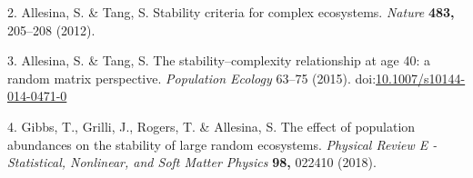 \documentclass[]{article}
\begin{document}
\hypertarget{ref-Allesina2012}{}
2. Allesina, S. \& Tang, S. Stability criteria for complex ecosystems.
\emph{Nature} \textbf{483,} 205--208 (2012).

\hypertarget{ref-Allesina2015a}{}
3. Allesina, S. \& Tang, S. The stability--complexity relationship at
age 40: a random matrix perspective. \emph{Population Ecology} 63--75
(2015).
doi:\href{https://doi.org/10.1007/s10144-014-0471-0}{10.1007/s10144-014-0471-0}

\hypertarget{ref-Gibbs2017}{}
4. Gibbs, T., Grilli, J., Rogers, T. \& Allesina, S. The effect of
population abundances on the stability of large random ecosystems.
\emph{Physical Review E - Statistical, Nonlinear, and Soft Matter
Physics} \textbf{98,} 022410 (2018).
\end{document}
